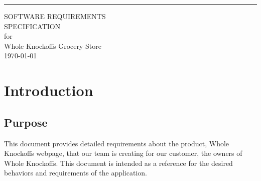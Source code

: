 \documentclass{scrreprt}
\date{}
\theoremstyle{funreq}
\def\myversion{1.0 }
\begin{document}
\begin{flushright}
    \rule{16cm}{5pt}\vskip1cm
    \begin{bfseries}
        \Huge{SOFTWARE REQUIREMENTS\\ SPECIFICATION}\\
        \vspace{1.9cm}
        for\\
        \vspace{1.9cm}
        Whole Knockoffs Grocery Store\\
        \vspace{1.9cm}
        \today\\
    \end{bfseries}
\end{flushright}

\tableofcontents


%

\chapter{Introduction}

\section{Purpose}
This document provides detailed requirements about the product, Whole Knockoffs webpage, that our team is creating for our customer, the owners of Whole Knockoffs.  This document is intended %
as a reference for the desired behaviors and requirements of the application.
\end{document}
